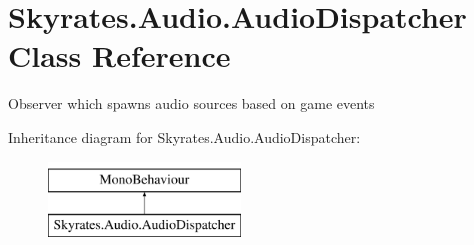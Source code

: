 \hypertarget{class_skyrates_1_1_audio_1_1_audio_dispatcher}{\section{Skyrates.\-Audio.\-Audio\-Dispatcher Class Reference}
\label{class_skyrates_1_1_audio_1_1_audio_dispatcher}
}


Observer which spawns audio sources based on game events  


Inheritance diagram for Skyrates.\-Audio.\-Audio\-Dispatcher\-:\begin{figure}[H]
\begin{center}
\leavevmode
\includegraphics[height=2.000000cm]{class_skyrates_1_1_audio_1_1_audio_dispatcher}
\end{center}
\end{figure}

